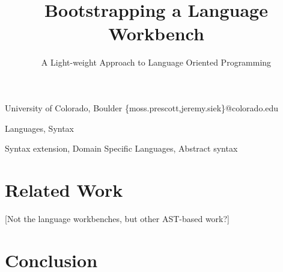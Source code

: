 \documentclass[preprint]{sigplanconf}
\begin{document}
\copyrightdata{[to be supplied]} 


\title{Bootstrapping a Language Workbench}
\subtitle{A Light-weight Approach to Language Oriented Programming}

           {University of Colorado, Boulder}
           {\{moss.prescott,jeremy.siek\}@colorado.edu}

\maketitle

\begin{abstract}
%
\end{abstract}


\terms
Languages, Syntax

\keywords
Syntax extension, Domain Specific Languages, Abstract syntax













\section{Related Work}
\label{related}
[Not the language workbenches, but other AST-based work?]

\section{Conclusion}
\label{conclusion}
~

\end{document}
